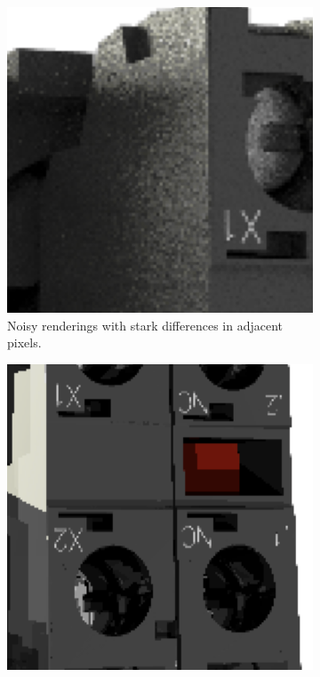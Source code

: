 \begin{figure}[H]
\begin{subfigure}[t]{0.3\textwidth}
        \includegraphics[width=\textwidth]{resources/good-seed-noisy.png}
        \caption{Noisy renderings with stark differences in adjacent pixels.}
        \label{fig:rngNoiseArtifactsHighlightsGoodNoisy}
    \end{subfigure}
    \hspace*{2cm}
    \vfill
    \vspace*{0.5cm}
    \hspace*{2cm}
    \begin{subfigure}[t]{0.3\textwidth}
        \includegraphics[width=\textwidth]{resources/bad-seed-anti-aliasing.png}

\end{subfigure}
\end{figure}
